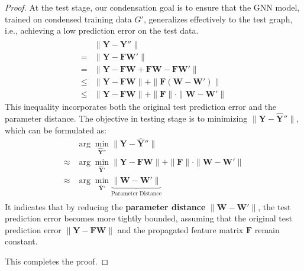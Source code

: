 \begin{proof}
At the test stage, our condensation goal is to ensure that the GNN model, trained on condensed training data $G'$, generalizes effectively to the test graph, i.e., achieving a low prediction error on the test data. 
\begin{equation}
\begin{aligned}
    &\| \mathbf{Y} - \hat{\mathbf{Y}}'' \|  \\
    = &\| \mathbf{Y} - \mathbf{F} \mathbf{W}' \|\\
    = & \| \mathbf{Y} - \mathbf{F} \mathbf{W} + \mathbf{F} \mathbf{W} - \mathbf{F} \mathbf{W}' \| \\
    \leq &\| \mathbf{Y} - \mathbf{F} \mathbf{W} \| + \| \mathbf{F} (\mathbf{W} - \mathbf{W}') \| \\
    \leq &\| \mathbf{Y} - \mathbf{F} \mathbf{W} \| + \| \mathbf{F}\| \cdot \|\mathbf{W} - \mathbf{W}' \|
\end{aligned}
\end{equation}
This inequality incorporates both the original test prediction error and the parameter distance. The objective in testing stage is to minimizing $\| \mathbf{Y} - \hat{\mathbf{Y}}''\|$, which can be formulated as:
\begin{equation}
    \begin{aligned}
    &\arg \min_{\hat{\mathbf{Y}}''} \| \mathbf{Y} - \hat{\mathbf{Y}}'' \|\\
    \approx&\arg \min_{\hat{\mathbf{Y}}'} \| \mathbf{Y} - \mathbf{F} \mathbf{W} \| + \| \mathbf{F}\| \cdot \|\mathbf{W} - \mathbf{W}' \|\\
    \approx&\arg \min_{\hat{\mathbf{Y}}'} \underbrace{\|\mathbf{W} - \mathbf{W}'\|}_{\text{Parameter Distance}} \\
    \end{aligned}
\end{equation}
It indicates that by reducing the \textbf{parameter distance} $\| \mathbf{W}- \mathbf{W}'\|$, the test prediction error becomes more tightly bounded, assuming that the original test prediction error \( \| \mathbf{Y} - \mathbf{F}\mathbf{W}\| \) and the propagated feature matrix \( \mathbf{F} \) remain constant. 

This completes the proof. 
\end{proof}



